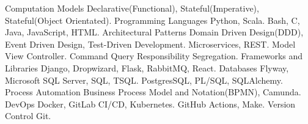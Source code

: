 \begin{cvskills}
  \cvskill
    {Computation Models} %
    { Declarative(Functional), Stateful(Imperative), Stateful(Object Orientated).} 
  \cvskill
    {Programming Languages} %
    {  Python, Scala. } 
  \cvskill
    {} %
    {  Bash, C, Java, JavaScript, HTML.} 
  \cvskill
    {Architectural Patterns} %
    {  Domain Driven Design(DDD), Event Driven Design, Test-Driven Development.}
  \cvskill
    {} %
    {  Microservices, REST.}
  \cvskill
    {} %
    {  Model View Controller.} 
  \cvskill
    {} %
    {  Command Query Responsibility Segregation.} 
  \cvskill
    {Frameworks and Libraries} %
    {  Django, Dropwizard, Flask, RabbitMQ, React.} 
  \cvskill
  {Databases} %
  {  Flyway, Microsoft SQL Server, SQL, TSQL.} 
  \cvskill
  {} %
  {  PostgresSQL, PL/SQL, SQLAlchemy.} 
  \cvskill
    {Process Automation}
    { Business Process Model and Notation(BPMN), Camunda.}
  \cvskill
    {DevOps} %
    { Docker, GitLab CI/CD, Kubernetes.} %
  \cvskill
    {} %
    {  GitHub Actions, Make.} 
  \cvskill
  {Version Control} %
  { Git.} %
\end{cvskills}
